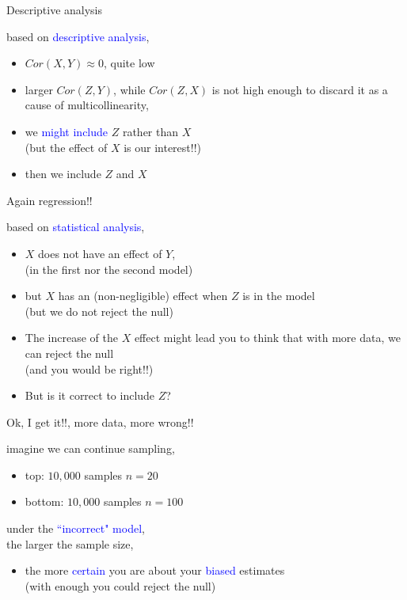%
%
\begin{lhframe}[rhgraphic={\texttt{[image: collider4\_panel.pdf]}}]
	{Descriptive analysis}
	
	based on \textcolor{blue}{descriptive analysis},
	\begin{itemize}
		\item $Cor(X, Y) \approx 0$, quite low
		\item larger $Cor(Z,Y)$, while $Cor(Z,X)$ is not high enough to discard it as a cause of multicollinearity,
		\item we \textcolor{blue}{might include} $Z$ rather than $X$ \\
		{\small (but the effect of $X$ is our interest!!)}
		\item then we include $Z$ and $X$
	\end{itemize}
\end{lhframe}
%
%
\begin{lhframe}[rhgraphic={\texttt{[image: collider4\_reg.png]}}]
	{Again regression!!}
	
	based on \textcolor{blue}{statistical analysis},
	\begin{itemize}
		\item $X$ does not have an effect of $Y$, \\
		{\small (in the first nor the second model)}
		\item but $X$ has an (non-negligible) effect when $Z$ is in the model \\
		{\small (but we do not reject the null)}
		\item The increase of the $X$ effect might lead you to think that with more data, we can reject the null \\
		{\small (and you would be right!!)} \\
		\item But is it correct to include $Z$?
	\end{itemize}
\end{lhframe}
%
%
\begin{lhframe}[rhgraphic={\texttt{[image: collider4\_samplesize.pdf]}}]
	{Ok, I get it!!, more data, more wrong!!}
	
	imagine we can continue sampling,
	\begin{itemize}
		\item top: $10,000$ samples $n=20$
		\item bottom: $10,000$ samples $n=100$
	\end{itemize}
	
	under the \textcolor{blue}{``incorrect" model}, \\
	the larger the sample size,
	\begin{itemize}
		\item the more \textcolor{blue}{certain} you are about your \textcolor{blue}{biased} estimates \\
		{\small (with enough you could reject the null)}
	\end{itemize}
\end{lhframe}

